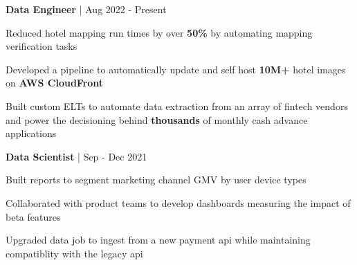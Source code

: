 


\begin{cventries}

\cventry
{\textbf{Data Engineer} | \color{awesome}{Super}}
{Aug 2022 - Present} %
{ %
\begin{cvitems}
\item {Reduced hotel mapping run times by over \textbf{50\%} by automating mapping verification tasks}
\item {Developed a pipeline to automatically update and self host \textbf{10M+} hotel images on \textbf{AWS CloudFront}}
\item {Built custom ELTs to automate data extraction from an array of fintech vendors and power the decisioning behind \textbf{thousands} of monthly cash advance applications}
\end{cvitems}
}

\cventry
{\textbf{Data Scientist} | \color{awesome}{Shopify}}
{Sep - Dec 2021} %
{ %
\begin{cvitems}
\item {Built reports to segment marketing channel GMV by user device types}
\item {Collaborated with product teams to develop dashboards measuring the impact of beta features}
\item {Upgraded data job to ingest from a new payment api while maintaining compatiblity with the legacy api}
\end{cvitems}
}


\end{cventries}
